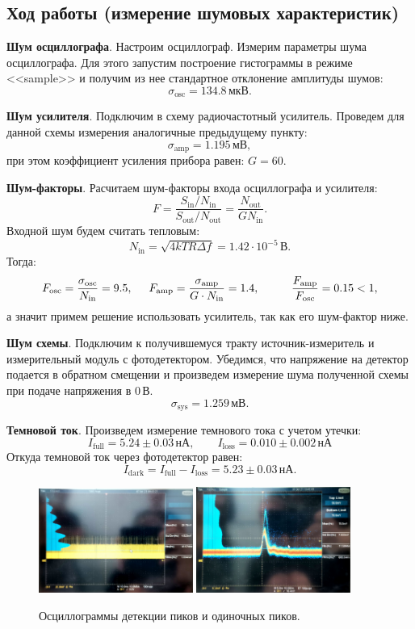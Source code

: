 \subsection*{Ход работы (измерение шумовых характеристик)}


\textbf{Шум осциллографа}.
Настроим осциллограф. Измерим параметры шума осциллографа. Для этого запустим построение гистограммы в режиме <<sample>> и получим из нее стандартное отклонение амплитуды шумов:
$$
\sigma_\text{osc} = 134.8\,\text{мкВ}.
$$

\textbf{Шум усилителя}.
Подключим в схему радиочастотный усилитель. Проведем для данной схемы измерения аналогичные предыдущему пункту:
$$
\sigma_\text{amp} = 1.195\,\text{мВ},
$$
при этом коэффициент усиления прибора равен: $G = 60$.

\textbf{Шум-факторы}.
Расчитаем шум-факторы входа осциллографа и усилителя:
$$
F = \frac{{S_\text{in}}/{N_\text{in}}}{{S_\text{out}}/{N_\text{out}}} = \frac{N_\text{out}}{GN_\text{in}}.
$$
Входной шум будем считать тепловым:
$$
N_\text{in} = \sqrt{4kTR\Delta f} = 1.42\cdot10^{-5}\,\text{В}.
$$
Тогда:
$$
F_\text{osc} = \frac{\sigma_\text{osc}}{N_\text{in}} = 9.5,
\hspace{5 mm} 
F_\text{amp} = \frac{\sigma_\text{amp}}{G\cdot N_\text{in}} = 1.4,
\hspace{10 mm} 
\frac{F_\text{amp}}{F_\text{osc}} = 0.15 < 1,
$$
а значит примем решение использовать усилитель, так как его шум-фактор ниже.

\textbf{Шум схемы}.
Подключим к получившемуся тракту источник-измеритель и измерительный модуль с фотодетектором. Убедимся, что напряжение на детектор подается в обратном смещении и произведем измерение шума полученной схемы при подаче напряжения в 0\,В.
$$
\sigma_\text{sys} = 1.259\,\text{мВ}.
$$


\textbf{Темновой ток}.
Произведем измерение темнового тока с учетом утечки:
$$
I_\text{full} = 5.24\pm 0.03\,\text{нА},\qquad I_\text{loss} = 0.010\pm 0.002\,\text{нА}
$$
Откуда темновой ток через фотодетектор равен:
$$
I_\text{dark} = I_\text{full} - I_\text{loss} = 5.23\pm 0.03\,\text{нА}.
$$


\begin{figure}[h]
    \centering
    \includegraphics[width=0.45\textwidth]{figures/1.png}
    \hspace{5 mm} 
    \includegraphics[width=0.45\textwidth]{figures/2.png}
    \caption{Осциллограммы детекции пиков и одиночных пиков.}
    \label{fig:0}
\end{figure}
